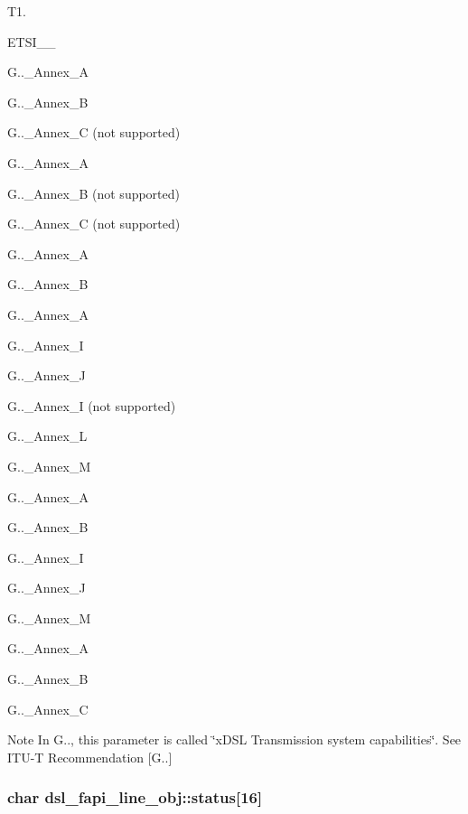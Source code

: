 \begin{DoxyItemize}
\item T1.
\item E\-T\-S\-I\-\_\-\_
\item G..\-\_\-\-Annex\-\_\-\-A
\item G..\-\_\-\-Annex\-\_\-\-B
\item G..\-\_\-\-Annex\-\_\-\-C (not supported)
\item G..\-\_\-\-Annex\-\_\-\-A
\item G..\-\_\-\-Annex\-\_\-\-B (not supported)
\item G..\-\_\-\-Annex\-\_\-\-C (not supported)
\item G..\-\_\-\-Annex\-\_\-\-A
\item G..\-\_\-\-Annex\-\_\-\-B
\item G..\-\_\-\-Annex\-\_\-\-A
\item G..\-\_\-\-Annex\-\_\-\-I
\item G..\-\_\-\-Annex\-\_\-\-J
\item G..\-\_\-\-Annex\-\_\-\-I (not supported)
\item G..\-\_\-\-Annex\-\_\-\-L
\item G..\-\_\-\-Annex\-\_\-\-M
\item G..\-\_\-\-Annex\-\_\-\-A
\item G..\-\_\-\-Annex\-\_\-\-B
\item G..\-\_\-\-Annex\-\_\-\-I
\item G..\-\_\-\-Annex\-\_\-\-J
\item G..\-\_\-\-Annex\-\_\-\-M
\item G..\-\_\-\-Annex\-\_\-\-A
\item G..\-\_\-\-Annex\-\_\-\-B
\item G..\-\_\-\-Annex\-\_\-\-C \begin{DoxyNote}{Note}
In G.., this parameter is called \char`\"{}x\-D\-S\-L Transmission system capabilities\char`\"{}. See I\-T\-U-\/\-T Recommendation \mbox{[}G..\mbox{]} 
\end{DoxyNote}

\end{DoxyItemize}\hypertarget{structdsl__fapi__line__obj_ac7cdd7ccd0685ff5b39a134416eb3dec}{
\subsubsection[{status}]{\setlength{\rightskip}{0pt plus 5cm}char dsl\-\_\-fapi\-\_\-line\-\_\-obj\-::status\mbox{[}16\mbox{]}}}\label{structdsl__fapi__line__obj_ac7cdd7ccd0685ff5b39a134416eb3dec}
